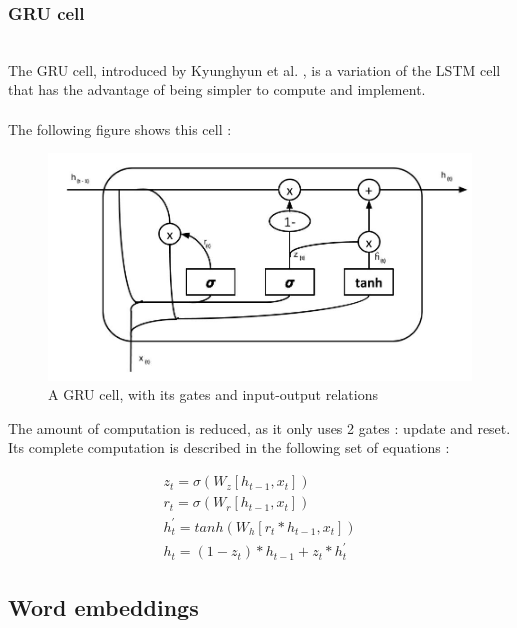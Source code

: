 \documentclass{llncs}
\begin{document}
\subsubsection{GRU cell}~\\

The GRU cell, introduced by Kyunghyun et al. \cite{GRU}, is a variation of the LSTM cell that has the advantage of being simpler to compute and implement.
\\
\\
The following figure shows this cell :

\begin{figure}[H]
    \centering
    \includegraphics[scale=0.4]{../_img/img_grucell.jpg}
    \caption{A GRU cell, with its gates and input-output relations}
    \label{fig:img_grucell}
\end{figure}

The amount of computation is reduced, as it only uses 2 gates : update and reset. Its complete computation is described in the following set of equations :

\begin{equation}
    \begin{gathered}
    z_{t} = \sigma( W_{z} [ h_{t - 1}, x_{t} ] ) \\
    r_{t} = \sigma( W_{r} [ h_{t - 1}, x_{t} ] ) \\
    h^{'}_{t} = tanh( W_{h} [ r_{t} * h_{t-1}, x_{t} ] ) \\
    h_{t} = ( 1 - z_{t} ) * h_{t - 1} + z_{t} * h^{'}_{t}
    \end{gathered}
\end{equation}

\subsection{Word embeddings}
\end{document}
